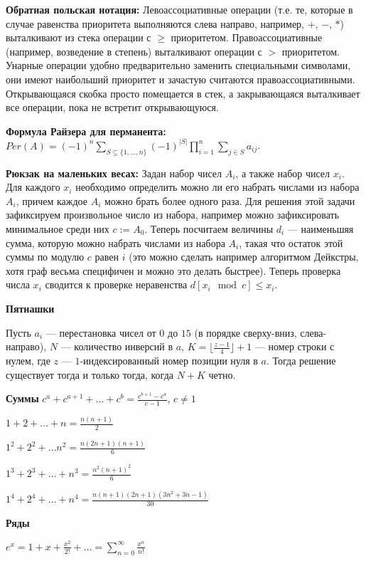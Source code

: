 \textbf{Обратная польская нотация:}
Левоассоциативные операции (т.е. те, которые в случае равенства приоритета выполняются слева направо, например, $+$, $-$, $*$)
выталкивают из стека операции с $\geq$ приоритетом. Правоассоциативные (например, возведение в степень) выталкивают операции
с $>$ приоритетом. Унарные операции удобно предварительно заменить специальными символами, они имеют наибольший приоритет и
зачастую считаются правоассоциативными. Открывающаяся скобка просто помещается в стек, а закрывающаяся выталкивает все
операции, пока не встретит открывающуюся.

\textbf{Формула Райзера для перманента:}
$Per(A)=(-1)^n\sum\limits_{S\subseteq \{1, \ldots , n\}}(-1)^{|S|}\prod\limits_{i=1}^n\sum\limits_{j\in S}a_{ij}$.

\textbf{Рюкзак на маленьких весах:}
Задан набор чисел $A_i$, а также набор чисел $x_i$. Для каждого $x_i$ необходимо определить можно ли его набрать числами из набора $A_i$, причем каждое $A_i$ можно брать
более одного раза. Для решения этой задачи зафиксируем произвольное число из набора, например можно зафиксировать минимальное среди них  $c := A_0$. Теперь посчитаем величины
$d_i$ --- наименьшяя сумма, которую можно набрать числами из набора $A_i$, такая что остаток этой суммы по модулю $c$ равен $i$ (это можно сделать например алгоритмом
Дейкстры, хотя граф весьма специфичен и можно это делать быстрее). Теперь проверка числа $x_i$ сводится к проверке неравенства $d[x_i \mod c] \le x_i$.

\textbf{Пятнашки}

Пусть $a_i$ --- перестановка чисел от $0$ до $15$ (в порядке сверху-вниз, слева-направо),
$N$ --- количество инверсий в $a$, $K = \lfloor\frac{z - 1}4\rfloor + 1$ --- номер строки с нулем,
где $z$ --- $1$-индексированный номер позиции нуля в $a$. Тогда решение существует тогда и только
тогда, когда $N + K$ четно.

\textbf{Суммы}
$
c^a + c^{a + 1} + \ldots + c^{b} = \frac{c^{b + 1} - c^{a}}{c - 1}
$, $c \neq 1$

$1 + 2 + \ldots + n = \frac{n(n + 1)}{2}$

$1^2 + 2^2 + \ldots n^2 = \frac{n(2n + 1)(n + 1)}{6}$

$1^3 + 2^3 + \ldots + n^3 = \frac{n^2(n + 1)^2}{6}$

$1^4 + 2^4 + \ldots + n^4 = \frac{n(n + 1)(2n + 1)(3n^2 + 3n - 1)}{30}$

\textbf{Ряды}

$e^x = 1 + x + \frac{x^2}{2!} + \ldots 
= \sum_{n=0}^{\infty}\frac{x^n}{n!}$

